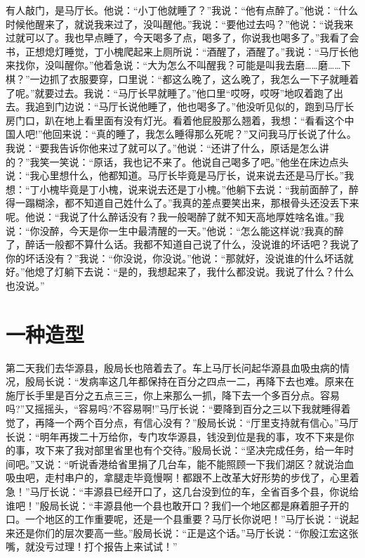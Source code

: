 \documentclass[12pt,oneside]{book}
\begin{document}
有人敲门，是马厅长。他说：``小丁他就睡了？''我说：``他有点醉了。''他说：``什么时候他醒来了，就说我来过了，没叫醒他。''我说：``要他过去吗？''他说：``说我来过就可以了。我也早点睡了，今天喝多了点，喝多了，你说我也喝多了。''我看了会书，正想熄灯睡觉，丁小槐爬起来上厕所说：``酒醒了，酒醒了。''我说：``马厅长他来找你，没叫醒你。''他着急说：``大为怎么不叫醒我？可能是叫我去磨\ldots\ldots 磨\ldots\ldots 下棋？''一边抓了衣服要穿，口里说：``都这么晚了，这么晚了，我怎么一下子就睡着了呢。''就要过去。我说：``马厅长早就睡了。''他口里``哎呀，哎呀''地叹着跑了出去。我追到门边说：``马厅长说他睡了，他也喝多了。''他没听见似的，跑到马厅长房门口，趴在地上看里面有没有灯光。看着他屁股那么翘着，我想：``看看这个中国人吧!''他回来说：``真的睡了，我怎么睡得那么死呢？''又问我马厅长说了什么。我说：``要我告诉你他来过了就可以了。''他说：``还讲了什么，原话是怎么讲的？''我笑一笑说：``原话，我也记不来了。他说自己喝多了吧。''他坐在床边点头说：``我心里想什么，他都知道。马厅长毕竟是马厅长，说来说去还是马厅长。''我想：``丁小槐毕竟是丁小槐，说来说去还是丁小槐。''他躺下去说：``我前面醉了，醉得一蹋糊涂，都不知道自己姓什么了。''我真的差点要笑出来，那根骨头还没丢下来呢。他说：``我说了什么醉话没有？我一般喝醉了就不知天高地厚姓啥名谁。''我说：``你没醉，今天是你一生中最清醒的一天。''他说：``怎么能这样说?我真的醉了，醉话一般都不算什么话。我都不知道自己说了什么，没说谁的坏话吧？我说了你的坏话没有？''我说：``你没说，你没说。''他说：``那就好，没说谁的什么坏话就好。''他熄了灯躺下去说：``是的，我想起来了，我什么都没说。我说了什么？什么也没说。''


\chapter{一种造型}
第二天我们去华源县，殷局长也陪着去了。车上马厅长问起华源县血吸虫病的情况，殷局长说：``发病率这几年都保持在百分之四点一二，再降下去也难。原来在施厅长手里是百分之五点三三，你上来那么一抓，降下去一个多百分点。容易吗?''又摇摇头，``容易吗?不容易啊!''马厅长说：``要降到百分之三以下我就睡得着觉了，再降一个两个百分点，有信心没有？''殷局长说：``厅里支持就有信心。''马厅长说：``明年再拨二十万给你，专门攻华源县，钱没到位是我的事，攻不下来是你的事，攻下来了我对部里省里也有个交待。''殷局长说：``坚决完成任务，给一年时间吧。''又说：``听说香港给省里捐了几台车，能不能照顾一下我们湖区？就说治血吸虫吧，走村串户的，拿腿走毕竟慢啊！都跟不上改革大好形势的步伐了，心里着急！''马厅长说：``丰源县已经开口了，这几台没到位的车，全省百多个县，你说给谁吧！''殷局长说：``丰源县他一个县也敢开口？我们一个地区都是麻着胆子开的口。一个地区的工作重要呢，还是一个县重要？马厅长你说吧！''马厅长说：``说起来还是你们的层次要高一些。''殷局长说：``正是这个话。''马厅长说：``你殷江宏这张嘴，就没亏过理！打个报告上来试试！''
\end{document}
